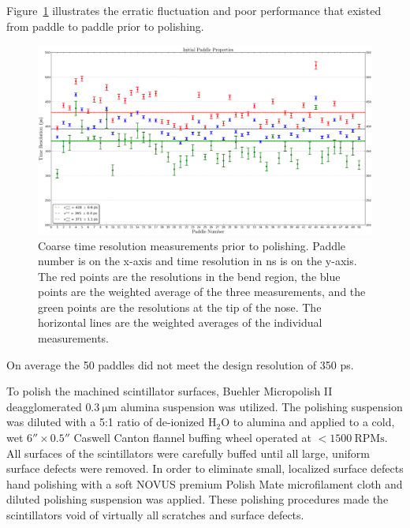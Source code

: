 Figure~\ref{fig:Initial_Paddle_Prop_UW} illustrates the erratic fluctuation and poor performance that existed from paddle to paddle prior to polishing. 
	\begin{figure}[!htb]
		\centering
		\includegraphics[width=1.0\columnwidth]{fabrication/figs/Initial_Paddle_Prop_UW}
		\caption{Coarse time resolution measurements prior to polishing. Paddle number is on the x-axis and time resolution in ns is on the y-axis. The red points are the resolutions in the bend region, the blue points are the weighted average of the three measurements, and the green points are the resolutions at the tip of the nose.  The horizontal lines are the weighted averages of the individual measurements.}
		\label{fig:Initial_Paddle_Prop_UW}
	\end{figure}
On average the 50 paddles did not meet the design resolution of 350 ps.

To polish the machined scintillator surfaces, Buehler Micropolish II deagglomerated $\mathrm{0.3\ \mu m}$ alumina suspension was utilized\cite{buehler}.  The polishing suspension was diluted with a 5:1 ratio of de-ionized $\mathrm{H_{2}O}$ to alumina and applied to a cold, wet $6'' \times 0.5''$ Caswell Canton flannel buffing wheel\cite{caswell} operated at $\mathrm{<1500~RPMs}$. All surfaces of the scintillators were carefully buffed until all large, uniform surface defects were removed. In order to eliminate small, localized surface defects hand polishing with a soft NOVUS premium Polish Mate microfilament cloth\cite{novus} and diluted polishing suspension was applied.  These polishing procedures made the scintillators void of virtually all scratches and surface defects.

